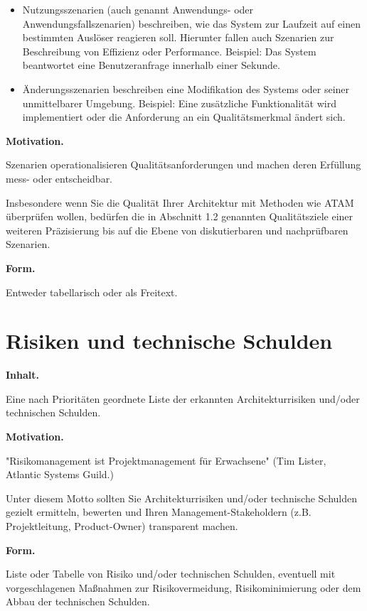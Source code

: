 \documentclass[]{article}
\begin{document}
\begin{itemize}
\item
  Nutzungsszenarien (auch genannt Anwendungs- oder
  Anwendungsfallszenarien) beschreiben, wie das System zur Laufzeit auf
  einen bestimmten Auslöser reagieren soll. Hierunter fallen auch
  Szenarien zur Beschreibung von Effizienz oder Performance. Beispiel:
  Das System beantwortet eine Benutzeranfrage innerhalb einer Sekunde.
\item
  Änderungsszenarien beschreiben eine Modifikation des Systems oder
  seiner unmittelbarer Umgebung. Beispiel: Eine zusätzliche
  Funktionalität wird implementiert oder die Anforderung an ein
  Qualitätsmerkmal ändert sich.
\end{itemize}

\textbf{Motivation.}

Szenarien operationalisieren Qualitätsanforderungen und machen deren
Erfüllung mess- oder entscheidbar.

Insbesondere wenn Sie die Qualität Ihrer Architektur mit Methoden wie
ATAM überprüfen wollen, bedürfen die in Abschnitt 1.2 genannten
Qualitätsziele einer weiteren Präzisierung bis auf die Ebene von
diskutierbaren und nachprüfbaren Szenarien.

\textbf{Form.}

Entweder tabellarisch oder als Freitext.

\section{Risiken und technische Schulden}\label{section-technical-risks}

\textbf{Inhalt.}

Eine nach Prioritäten geordnete Liste der erkannten Architekturrisiken
und/oder technischen Schulden.

\textbf{Motivation.}

"Risikomanagement ist Projektmanagement für Erwachsene" (Tim Lister,
Atlantic Systems Guild.)

Unter diesem Motto sollten Sie Architekturrisiken und/oder technische
Schulden gezielt ermitteln, bewerten und Ihren Management-Stakeholdern
(z.B. Projektleitung, Product-Owner) transparent machen.

\textbf{Form.}

Liste oder Tabelle von Risiko und/oder technischen Schulden, eventuell
mit vorgeschlagenen Maßnahmen zur Risikovermeidung, Risikominimierung
oder dem Abbau der technischen Schulden.
\end{document}

